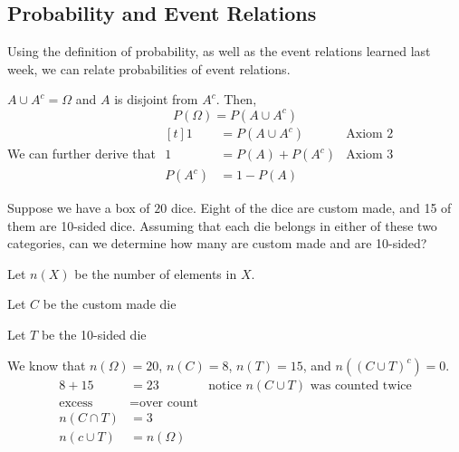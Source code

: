 \subsection{Probability and Event Relations}

Using the definition of probability, as well as the event relations learned last week, we can relate probabilities of event relations.

\begin{proposition}
    $A \cup A^c = \Omega$ and $A$ is disjoint from $A^c$. Then, $$P(\Omega) = P(A \cup A^c)$$
    We can further derive that $\begin{aligned}[t]
            1      & = P(A \cup A^c) & \text{Axiom 2} \\
            1      & = P(A) + P(A^c) & \text{Axiom 3} \\
            P(A^c) & = 1 - P(A)
        \end{aligned}$
\end{proposition}

\begin{example}
    Suppose we have a box of $20$ dice. Eight of the dice are custom made, and 15 of them are 10-sided dice. Assuming that each die belongs in either of these two categories, can we determine how many are custom made and are 10-sided?

    Let $n(X)$ be the number of elements in $X$.

    Let $C$ be the custom made die

    Let $T$ be the 10-sided die

    We know that $n(\Omega) = 20$, $n(C) = 8$, $n(T) = 15$, and $n((C \cup T)^c) = 0$.
    \begin{align*}
        8 + 15        & = 23                & \text{notice } n(C \cup T) \text{ was counted twice} \\
        \text{excess} & = \text{over count}                                                        \\
        n(C \cap T)   & = 3                                                                        \\
        n(c \cup T)   & = n(\Omega)
    \end{align*}
\end{example}


